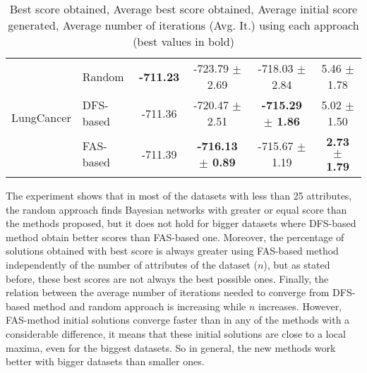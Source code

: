 \begin{table}[ h ]
\begin{tabular}{| c | l | c | c | c | c | }
			\multirow{3}{*}{LungCancer} & Random & \textbf{-711.23} & -723.79 $\pm$ 2.69 & -718.03 $\pm$ 2.84 & 5.46 $\pm$ 1.78 \\ \cline{2-6} 
					& DFS-based & -711.36 & -720.47 $\pm$ 2.51 & \textbf{-715.29 $\pm$ 1.86} & 5.02 $\pm$ 1.50 \\ \cline{2-6}
					& FAS-based & -711.39 & \textbf{-716.13 $\pm$ 0.89} & -715.67 $\pm$ 1.19 & \textbf{2.73 $\pm$ 1.79} \\ \hline
		\end{tabular}
		\caption{Best score obtained, Average best score obtained, Average initial score generated, Average number of iterations (Avg. It.) using each approach (best values in bold)}
		\label{tab:comparison}
	\end{table}
	\vspace{-4mm}
The experiment shows that in most of the datasets with less than 25 attributes, the random approach finds Bayesian networks with greater or equal score than the methods proposed, but it does not hold for bigger datasets where DFS-based method obtain better scores than FAS-based one. Moreover, the percentage of solutions obtained with best score is always greater using FAS-based method independently of the number of attributes of the dataset ($n$), but as stated before, these best scores are not always the best possible ones. Finally, the relation between the average number of iterations needed to converge from DFS-based method and random approach is increasing while $n$ increases. However, FAS-method initial solutions converge faster than in any of the methods with a considerable difference, it means that these initial solutions are close to a local maxima, even for the biggest datasets. So in general, the new methods work better with bigger datasets than smaller ones.

	\begin{comment}
	Finally, Figure~\ref{fig:converge} shows the converge curve for each data set using each approach.
		
	 \end{comment}

